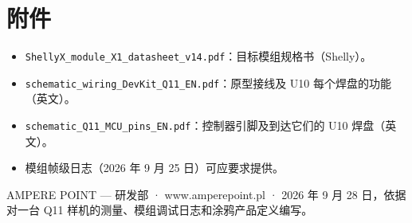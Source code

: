 \documentclass[11pt,a4paper]{article}
\begin{document}
\section{附件}

\begin{itemize}
\item \texttt{ShellyX\_module\_X1\_datasheet\_v14.pdf}：目标模组规格书（Shelly）。
\item \texttt{schematic\_wiring\_DevKit\_Q11\_EN.pdf}：原型接线及 U10 每个焊盘的功能（英文）。
\item \texttt{schematic\_Q11\_MCU\_pins\_EN.pdf}：控制器引脚及到达它们的 U10 焊盘（英文）。
\item 模组帧级日志（2026 年 9 月 25 日）可应要求提供。
\end{itemize}

{\color{apmuted}\small AMPERE POINT — 研发部 · www.amperepoint.pl · 2026 年 9 月 28 日，依据对一台 Q11 样机的测量、模组调试日志和涂鸦产品定义编写。}
\end{document}
